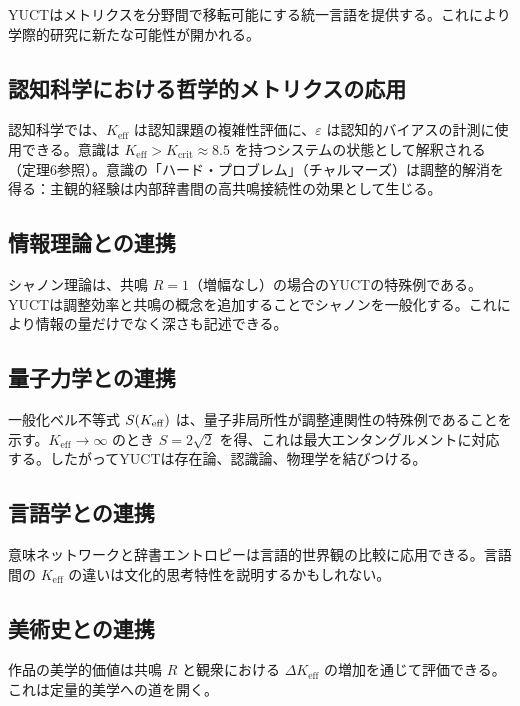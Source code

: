 \documentclass[11pt,a4paper]{article}
\newcommand{\eps}{\varepsilon}
\begin{document}
	YUCTはメトリクスを分野間で移転可能にする統一言語を提供する。これにより学際的研究に新たな可能性が開かれる。
	
	\subsection{認知科学における哲学的メトリクスの応用}
	
	認知科学では、\(K_{\mathrm{eff}}\) は認知課題の複雑性評価に、\(\eps\) は認知的バイアスの計測に使用できる。意識は \(K_{\mathrm{eff}} > K_{\mathrm{crit}} \approx 8.5\) を持つシステムの状態として解釈される（定理6参照）。意識の「ハード・プロブレム」（チャルマーズ）は調整的解消を得る：主観的経験は内部辞書間の高共鳴接続性の効果として生じる。
	
	\subsection{情報理論との連携}
	
	シャノン理論は、共鳴 \(R = 1\)（増幅なし）の場合のYUCTの特殊例である。YUCTは調整効率と共鳴の概念を追加することでシャノンを一般化する。これにより情報の量だけでなく深さも記述できる。
	
	\subsection{量子力学との連携}
	
	一般化ベル不等式 \(S(\Keff)\) は、量子非局所性が調整連関性の特殊例であることを示す。\(K_{\mathrm{eff}} \to \infty\) のとき \(S = 2\sqrt{2}\) を得、これは最大エンタングルメントに対応する。したがってYUCTは存在論、認識論、物理学を結びつける。
	
	\subsection{言語学との連携}
	
	意味ネットワークと辞書エントロピーは言語的世界観の比較に応用できる。言語間の \(K_{\mathrm{eff}}\) の違いは文化的思考特性を説明するかもしれない。
	
	\subsection{美術史との連携}
	
	作品の美学的価値は共鳴 \(R\) と観衆における \(\Delta K_{\mathrm{eff}}\) の増加を通じて評価できる。これは定量的美学への道を開く。
	
\end{document}
